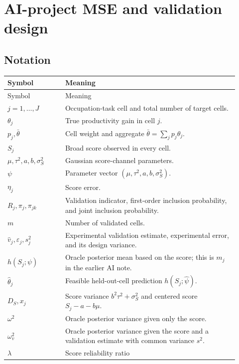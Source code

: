 \documentclass[11pt]{article}
\begin{document}
\section{AI-project MSE and validation design}

\subsection*{Notation}

\begin{longtable}{>{\raggedright\arraybackslash}p{0.23\linewidth}
                  >{\raggedright\arraybackslash}p{0.69\linewidth}}
\toprule
Symbol & Meaning \\
\midrule
\endfirsthead
\toprule
Symbol & Meaning \\
\midrule
\endhead
\(j=1,\ldots,J\) & Occupation-task cell and total number of target cells. \\
\(\theta_j\) & True productivity gain in cell \(j\). \\
\(p_j,\bar\theta\) & Cell weight and aggregate
\(\bar\theta=\sum_jp_j\theta_j\). \\
\(S_j\) & Broad score observed in every cell. \\
\(\mu,\tau^2,a,b,\sigma_S^2\) & Gaussian score-channel parameters. \\
\(\psi\) & Parameter vector
\((\mu,\tau^2,a,b,\sigma_S^2)\). \\
\(\eta_j\) & Score error. \\
\(R_j,\pi_j,\pi_{jk}\) & Validation indicator, first-order inclusion
probability, and joint inclusion probability. \\
\(m\) & Number of validated cells. \\
\(\widehat v_j,\varepsilon_j,s_j^2\) & Experimental validation estimate,
experimental error, and its design variance. \\
\(h(S_j;\psi)\) & Oracle posterior mean based on the score; this is \(m_j\) in
the earlier AI note. \\
\(\widehat\theta_j\) & Feasible held-out-cell prediction
\(h(S_j;\widehat\psi)\). \\
\(D_S,x_j\) & Score variance \(b^2\tau^2+\sigma_S^2\) and centered score
\(S_j-a-b\mu\). \\
\(\omega^2\) & Oracle posterior variance given only the score. \\
\(\omega_v^2\) & Oracle posterior variance given the score and a validation
estimate with common variance \(s^2\). \\
\(\lambda\) & Score reliability ratio

\end{longtable}
\end{document}
